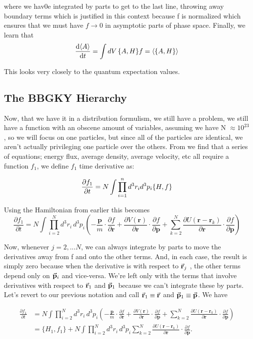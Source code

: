 where we hav0e integrated by parts to get to the last line, throwing away boundary terms which is justified in this context because f is normalized which ensures that we must have $f \to 0$ in asymptotic parts of phase space. Finally, we learn that
\[
\dv{\langle A \rangle}{t} = \int dV \, \pb{A}{H}f = \langle \pb{A}{H} \rangle
\]

This looks very closely to the quantum expectation values.

\subsection{The BBGKY Hierarchy}

Now, that we have it in a distribution formulism, we still have a problem, we still have a function with an obscene amount of variables, assuming we have N $\approx 10^{23}$, so we will focus on one particles, but since all of the particles are identical, we aren't actually privileging one particle over the others. From we find that a series of equations; energy flux, average density, average velocity, etc all require a function $f_1$, we define $f_1$ time derivative as:

\[
\pdv{f_1}{t} = N \int \prod_{i=1}^n d^3r_i d^3 p_i \pb{H}{f}
  \]

  Using the Hamiltonian from earlier this becomes
\[
  \frac{\partial f_1}{\partial t} = N \int \prod_{i=2}^{N} d^3r_i\, d^3p_i \left( -\frac{\mathbf p}{m}\cdot\frac{\partial f}{\partial \mathbf r} +\frac{\partial V(\mathbf r)}{\partial \mathbf r}\cdot\frac{\partial f}{\partial \mathbf p} +\sum_{k=2}^{N} \frac{\partial U(\mathbf r-\mathbf r_k)}{\partial \mathbf r}\cdot \frac{\partial f}{\partial \mathbf p} \right)
\]

Now, whenever $j =2,...N$, we can always integrate by parts to move the derivatives
away from f and onto the other terms. And, in each case, the result is simply zero
because when the derivative is with respect to $\va{r}_j$ , the other terms depend only on $\va{p}_i$
and vice-versa. We’re left only with the terms that involve derivatives with respect
to $\va{r}_1$ and $\va{p}_1$ because we can’t integrate these by parts. Let’s revert to our previous
notation and call $\va{r}_1 \equiv \va{r}$ and $\va{p}_1 \equiv \va{p}$. We have

\begin{align}
  \frac{\partial f_1}{\partial t} &= N \int \prod_{i=2}^{N} d^3r_i\, d^3p_i \left( -\frac{\mathbf p}{m}\cdot\frac{\partial f}{\partial \mathbf r} +\frac{\partial V(\mathbf r)}{\partial \mathbf r}\cdot\frac{\partial f}{\partial \mathbf p} +\sum_{k=2}^{N} \frac{\partial U(\mathbf r-\mathbf r_k)}{\partial \mathbf r}\cdot \frac{\partial f}{\partial \mathbf p} \right) \\
 &= \{H_1,f_1\} + N \int \prod_{i=2}^{N} d^3r_i\, d^3p_i \sum_{k=2}^{N} \frac{\partial U(\mathbf r-\mathbf r_k)}{\partial \mathbf r}\cdot \frac{\partial f}{\partial \mathbf p}. \tag{2.10}
\end{align}


